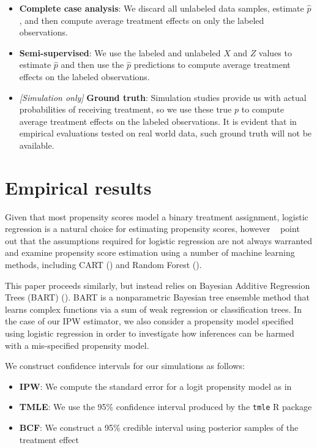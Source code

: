 \documentclass[aos]{imsart}
\begin{document}
\begin{itemize}
\item \textbf{Complete case analysis}: We discard all unlabeled data samples, estimate $\hat{p}$, and then compute average treatment effects on only the labeled observations.
\item \textbf{Semi-supervised}: We use the labeled and unlabeled $X$ and $Z$ values to estimate $\hat{p}$ and then use the $\hat{p}$ predictions to compute average treatment effects on the labeled observations.
\item \textit{[Simulation only]} \textbf{Ground truth}: Simulation studies provide us with actual probabilities of receiving treatment, so we use these true $p$ to compute average treatment effects on the labeled observations. It is evident that in empirical evaluations tested on real world data, such ground truth will not be available.
\end{itemize}

\section{Empirical results}

Given that most propensity scores model a binary treatment assignment, logistic regression is a natural choice for 
estimating propensity scores, however ~\cite{lee2010improving} point out that the assumptions required for logistic 
regression are not always warranted and examine propensity score estimation using a number of machine learning 
methods, including CART (\cite{breiman1984classification}) and Random Forest (\cite{breiman2001random}).

This paper proceeds similarly, but instead relies on Bayesian Additive Regression Trees (BART) (\cite{chipman2010bart}). 
BART is a nonparametric Bayesian tree ensemble method that learns complex functions via a sum of weak regression 
or classification trees. In the case of our IPW estimator, we also consider a propensity model specified using logistic regression 
in order to investigate how inferences can be harmed with a mis-specified propensity model.

We construct confidence intervals for our simulations as follows:

\begin{itemize}
	\item \textbf{IPW}: We compute the standard error for a logit propensity model as in \cite{cerulli2014treatrew}
	\item \textbf{TMLE}: We use the 95\% confidence interval produced by the \texttt{tmle} R package
	\item \textbf{BCF}: We construct a 95\% credible interval using posterior samples of the treatment effect 
\end{itemize}
\end{document}
